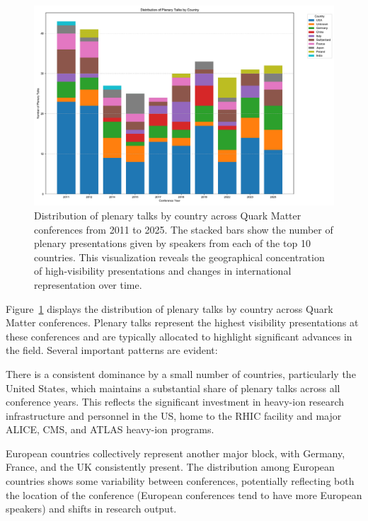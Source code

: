 \documentclass[a4paper,11pt]{article}
\begin{document}
\begin{figure}[H]
\centering
\includegraphics[width=\textwidth]{figures/plenary_talks_by_country.pdf}
\caption{Distribution of plenary talks by country across Quark Matter conferences from 2011 to 2025. The stacked bars show the number of plenary presentations given by speakers from each of the top 10 countries. This visualization reveals the geographical concentration of high-visibility presentations and changes in international representation over time.}
\label{fig:country_plenary}
\end{figure}

Figure~\ref{fig:country_plenary} displays the distribution of plenary talks by country across Quark Matter conferences. Plenary talks represent the highest visibility presentations at these conferences and are typically allocated to highlight significant advances in the field. Several important patterns are evident:

There is a consistent dominance by a small number of countries, particularly the United States, which maintains a substantial share of plenary talks across all conference years. This reflects the significant investment in heavy-ion research infrastructure and personnel in the US, home to the RHIC facility and major ALICE, CMS, and ATLAS heavy-ion programs.

European countries collectively represent another major block, with Germany, France, and the UK consistently present. The distribution among European countries shows some variability between conferences, potentially reflecting both the location of the conference (European conferences tend to have more European speakers) and shifts in research output.
\end{document}
